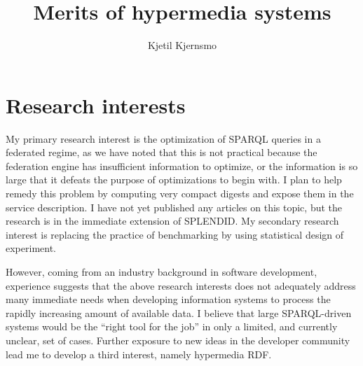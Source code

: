 \usepackage[utf8]{inputenc}
\usepackage{cite}
\usepackage{verbatim}
\usepackage{graphicx}

\title{Merits of hypermedia systems}
\author{Kjetil Kjernsmo}



\maketitle

\section{Research interests}

My primary research interest is the optimization of SPARQL queries in
a federated regime, as we have noted that this is not practical
because the federation engine has insufficient information to
optimize, or the information is so large that it defeats the purpose
of optimizations to begin with. I plan to help remedy this problem by
computing very compact digests and expose them in the service
description. I have not yet published any articles on this topic, but
the research is in the immediate extension of
SPLENDID\cite{splendid}. My secondary research interest is replacing
the practice of benchmarking by using statistical design of
experiment. 

However, coming from an industry background in software development,
experience suggests that the above research interests does not
adequately address many immediate needs when developing information
systems to process the rapidly increasing amount of available data. I
believe that large SPARQL-driven systems would be the ``right tool for
the job'' in only a limited, and currently unclear, set of
cases. Further exposure to new ideas in the developer community lead
me to develop a third interest, namely hypermedia RDF. 
